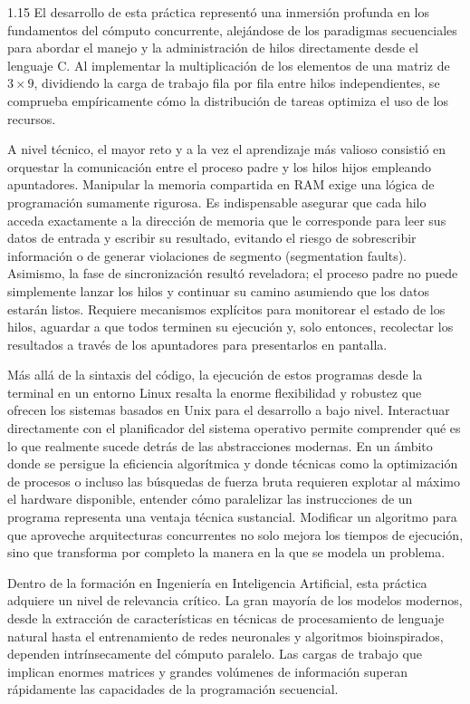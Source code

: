 \documentclass[11pt, a4paper]{article}
\begin{document}
\begin{spacing}{1.15}
El desarrollo de esta práctica representó una inmersión profunda en los fundamentos del cómputo concurrente, alejándose de los paradigmas secuenciales para abordar el manejo y la administración de hilos directamente desde el lenguaje C. Al implementar la multiplicación de los elementos de una matriz de $3 \times 9$, dividiendo la carga de trabajo fila por fila entre hilos independientes, se comprueba empíricamente cómo la distribución de tareas optimiza el uso de los recursos. 

A nivel técnico, el mayor reto y a la vez el aprendizaje más valioso consistió en orquestar la comunicación entre el proceso padre y los hilos hijos empleando apuntadores. Manipular la memoria compartida en RAM exige una lógica de programación sumamente rigurosa. Es indispensable asegurar que cada hilo acceda exactamente a la dirección de memoria que le corresponde para leer sus datos de entrada y escribir su resultado, evitando el riesgo de sobrescribir información o de generar violaciones de segmento (segmentation faults). Asimismo, la fase de sincronización resultó reveladora; el proceso padre no puede simplemente lanzar los hilos y continuar su camino asumiendo que los datos estarán listos. Requiere mecanismos explícitos para monitorear el estado de los hilos, aguardar a que todos terminen su ejecución y, solo entonces, recolectar los resultados a través de los apuntadores para presentarlos en pantalla.

Más allá de la sintaxis del código, la ejecución de estos programas desde la terminal en un entorno Linux resalta la enorme flexibilidad y robustez que ofrecen los sistemas basados en Unix para el desarrollo a bajo nivel. Interactuar directamente con el planificador del sistema operativo permite comprender qué es lo que realmente sucede detrás de las abstracciones modernas. En un ámbito donde se persigue la eficiencia algorítmica y donde técnicas como la optimización de procesos o incluso las búsquedas de fuerza bruta requieren explotar al máximo el hardware disponible, entender cómo paralelizar las instrucciones de un programa representa una ventaja técnica sustancial. Modificar un algoritmo para que aproveche arquitecturas concurrentes no solo mejora los tiempos de ejecución, sino que transforma por completo la manera en la que se modela un problema.

Dentro de la formación en Ingeniería en Inteligencia Artificial, esta práctica adquiere un nivel de relevancia crítico. La gran mayoría de los modelos modernos, desde la extracción de características en técnicas de procesamiento de lenguaje natural hasta el entrenamiento de redes neuronales y algoritmos bioinspirados, dependen intrínsecamente del cómputo paralelo. Las cargas de trabajo que implican enormes matrices y grandes volúmenes de información superan rápidamente las capacidades de la programación secuencial. 


\end{spacing}
\end{document}
